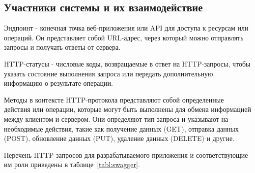 \subsection*{Участники системы и их взаимодействие}

Эндпоинт - конечная точка веб-приложения или API для доступа к ресурсам или операций.
Он представляет собой URL-адрес, через который можно отправлять запросы и получать ответы от сервера.

HTTP-статусы - числовые коды, возвращаемые в ответ на HTTP-запросы,
чтобы указать состояние выполнения запроса или передать дополнительную информацию о результате операции.


Методы в контексте HTTP-протокола представляют собой определенные действия или операции,
которые могут быть выполнены для обмена информацией между клиентом и сервером.
Они определяют тип запроса и указывают на необходимые действия, такие как получение данных (GET), отправка данных (POST), обновление данных (PUT), удаление данных (DELETE) и другие.

Перечень HTTP запросов для разрабатываемого приложения и соответствующие им роли приведены в таблице~\ref{tabl:swagger}.

